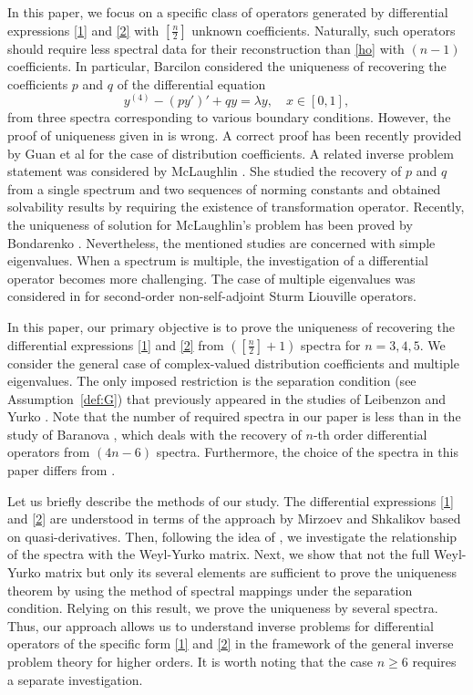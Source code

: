 \documentclass[reqno,12pt,centertags]{amsart}
\numberwithin{equation}{section}
\theoremstyle{definition}
\begin{document}
In this paper, we focus on a specific class of operators generated by differential expressions \eqref{1} and \eqref{2} with $[\frac{n}{2}]$ unknown coefficients. Naturally, such operators should require less spectral data for their reconstruction than \eqref{ho} with $(n-1)$ coefficients. In particular, Barcilon \cite{Bar1} considered the uniqueness of recovering the coefficients $p$ and $q$ of the differential equation
\begin{equation}\label{4444}
y^{(4)} - (p y')' + q y = \lambda y, \quad x \in [0,1],
\end{equation}
from three spectra corresponding to various boundary conditions. However, the proof of uniqueness given in \cite{Bar1} is wrong. A correct proof has been recently provided by Guan et al \cite{Guan} for the case of distribution coefficients. A related inverse problem statement was considered by McLaughlin \cite{Mc1, Mc2}. She studied the recovery of $p$ and $q$ from a single spectrum and two sequences of norming constants and obtained solvability results by requiring the existence of transformation operator. Recently, the uniqueness of solution for McLaughlin's problem has been proved by Bondarenko \cite{Bon9}. Nevertheless, the mentioned studies are concerned with simple eigenvalues.
When a spectrum is multiple, the investigation of a differential operator becomes more challenging. The case of multiple eigenvalues was considered in \cite{But1,But2,tac} for second-order non-self-adjoint Sturm Liouville operators.

In this paper, our primary objective is to prove the uniqueness of recovering the differential expressions \eqref{1} and \eqref{2} from $([\frac{n}{2}] + 1)$ spectra for $n = 3, 4, 5$. We consider the general case of complex-valued distribution coefficients and multiple eigenvalues. The only imposed restriction is the separation condition (see Assumption~\ref{def:G}) that previously appeared in the studies of Leibenzon \cite{Leib66} and Yurko \cite{Yur}. Note that the number of required spectra in our paper is less than in the study of Baranova \cite{Bara}, which deals with the recovery of $n$-th order differential operators from $(4n-6)$ spectra. Furthermore, the choice of the spectra in this paper differs from \cite{Bara}.

Let us briefly describe the methods of our study.
The differential expressions \eqref{1} and \eqref{2} are understood in terms of the approach by Mirzoev and Shkalikov \cite{Mir1, Mir2} based on quasi-derivatives.
Then, following the idea of \cite{Guan}, we
investigate the relationship of the spectra with the Weyl-Yurko
matrix. Next, we show that not the full Weyl-Yurko matrix but only its several elements are sufficient to prove the uniqueness theorem by using the method of spectral mappings under the separation condition. Relying on this result, we prove the uniqueness by several spectra. Thus, our approach allows us to understand inverse problems for differential operators of the specific form \eqref{1} and \eqref{2} in the framework of the general inverse problem theory \cite{Yur, Bon1} for higher orders.
It is worth noting that the case $n\geq6$ requires a separate investigation.
\end{document}
